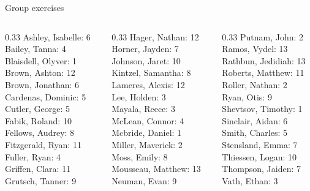 \documentclass[10pt]{beamer}
\begin{document}
\begin{frame}[standout]
Group exercises
\end{frame}

\begin{frame}
\begin{columns}
\begin{column}{0.33\textwidth}
Ashley, Isabelle: 6 \\ 
Bailey, Tanna: 4 \\ 
Blaisdell, Olyver: 1 \\ 
Brown, Ashton: 12 \\ 
Brown, Jonathan: 6 \\ 
Cardenas, Dominic: 5 \\ 
Cutler, George: 5 \\ 
Fabik, Roland: 10 \\ 
Fellows, Audrey: 8 \\ 
Fitzgerald, Ryan: 11 \\ 
Fuller, Ryan: 4 \\ 
Griffen, Clara: 11 \\ 
Grutsch, Tanner: 9 \\\end{column}
\begin{column}{0.33\textwidth}
Hager, Nathan: 12 \\ 
Horner, Jayden: 7 \\ 
Johnson, Jaret: 10 \\ 
Kintzel, Samantha: 8 \\ 
Lameres, Alexis: 12 \\ 
Lee, Holden: 3 \\ 
Mayala, Reece: 3 \\ 
McLean, Connor: 4 \\ 
Mcbride, Daniel: 1 \\ 
Miller, Maverick: 2 \\ 
Moss, Emily: 8 \\ 
Mousseau, Matthew: 13 \\ 
Neuman, Evan: 9 \\\end{column}
\begin{column}{0.33\textwidth}
Putnam, John: 2 \\ 
Ramos, Vydel: 13 \\ 
Rathbun, Jedidiah: 13 \\ 
Roberts, Matthew: 11 \\ 
Roller, Nathan: 2 \\ 
Ryan, Otis: 9 \\ 
Shevtsov, Timothy: 1 \\ 
Sinclair, Aidan: 6 \\ 
Smith, Charles: 5 \\ 
Stensland, Emma: 7 \\ 
Thiessen, Logan: 10 \\ 
Thompson, Jaiden: 7 \\ 
Vath, Ethan: 3 \\\end{column}
\end{columns}
\end{frame}
\end{document}
